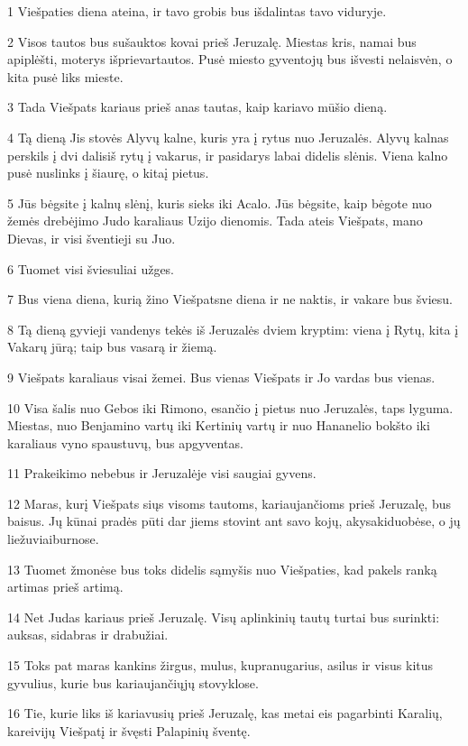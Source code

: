 \par 1 Viešpaties diena ateina, ir tavo grobis bus išdalintas tavo viduryje. 
\par 2 Visos tautos bus sušauktos kovai prieš Jeruzalę. Miestas kris, namai bus apiplėšti, moterys išprievartautos. Pusė miesto gyventojų bus išvesti nelaisvėn, o kita pusė liks mieste. 
\par 3 Tada Viešpats kariaus prieš anas tautas, kaip kariavo mūšio dieną. 
\par 4 Tą dieną Jis stovės Alyvų kalne, kuris yra į rytus nuo Jeruzalės. Alyvų kalnas perskils į dvi dalis­iš rytų į vakarus, ir pasidarys labai didelis slėnis. Viena kalno pusė nuslinks į šiaurę, o kita­į pietus. 
\par 5 Jūs bėgsite į kalnų slėnį, kuris sieks iki Acalo. Jūs bėgsite, kaip bėgote nuo žemės drebėjimo Judo karaliaus Uzijo dienomis. Tada ateis Viešpats, mano Dievas, ir visi šventieji su Juo. 
\par 6 Tuomet visi šviesuliai užges. 
\par 7 Bus viena diena, kurią žino Viešpats­ne diena ir ne naktis, ir vakare bus šviesu. 
\par 8 Tą dieną gyvieji vandenys tekės iš Jeruzalės dviem kryptim: viena į Rytų, kita į Vakarų jūrą; taip bus vasarą ir žiemą. 
\par 9 Viešpats karaliaus visai žemei. Bus vienas Viešpats ir Jo vardas bus vienas. 
\par 10 Visa šalis nuo Gebos iki Rimono, esančio į pietus nuo Jeruzalės, taps lyguma. Miestas, nuo Benjamino vartų iki Kertinių vartų ir nuo Hananelio bokšto iki karaliaus vyno spaustuvų, bus apgyventas. 
\par 11 Prakeikimo nebebus ir Jeruzalėje visi saugiai gyvens. 
\par 12 Maras, kurį Viešpats siųs visoms tautoms, kariaujančioms prieš Jeruzalę, bus baisus. Jų kūnai pradės pūti dar jiems stovint ant savo kojų, akys­akiduobėse, o jų liežuviai­burnose. 
\par 13 Tuomet žmonėse bus toks didelis sąmyšis nuo Viešpaties, kad pakels ranką artimas prieš artimą. 
\par 14 Net Judas kariaus prieš Jeruzalę. Visų aplinkinių tautų turtai bus surinkti: auksas, sidabras ir drabužiai. 
\par 15 Toks pat maras kankins žirgus, mulus, kupranugarius, asilus ir visus kitus gyvulius, kurie bus kariaujančiųjų stovyklose. 
\par 16 Tie, kurie liks iš kariavusių prieš Jeruzalę, kas metai eis pagarbinti Karalių, kareivijų Viešpatį ir švęsti Palapinių šventę. 
